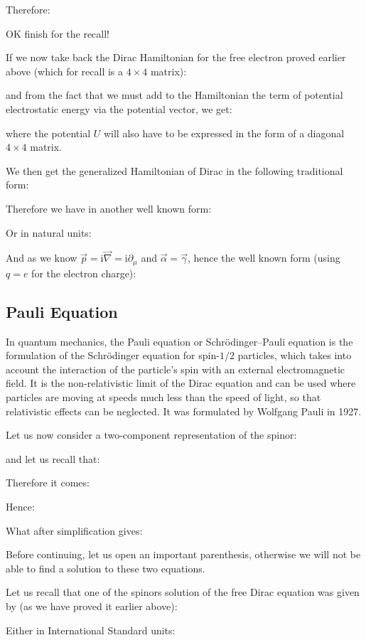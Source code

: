 	Therefore:
	
	OK finish for the recall!
	
	If we now take back the Dirac Hamiltonian for the free electron proved earlier above (which for recall is a $4\times 4$ matrix):
	
	and from the fact that we must add to the Hamiltonian the term of potential electrostatic energy via the potential vector, we get:
	
	where the potential $U$ will also have to be expressed in the form of a diagonal $4\times 4$ matrix.

	We then get the generalized Hamiltonian of Dirac in the following traditional form:
	
	Therefore we have in another well known form:
	
	Or in natural units:
	
	And as we know $\vec{p}=\mathrm{i}\vec{\nabla}=\mathrm{i}\partial_\mu$ and $\vec{\alpha}=\vec{\gamma}$, hence the well known form (using $q=e$ for the electron charge):
	
	
	\pagebreak
	\subsection{Pauli Equation}\label{pauli equation}
	In quantum mechanics, the Pauli equation or Schrödinger–Pauli equation is the formulation of the Schrödinger equation for spin-$1/2$ particles, which takes into account the interaction of the particle's spin with an external electromagnetic field. It is the non-relativistic limit of the Dirac equation and can be used where particles are moving at speeds much less than the speed of light, so that relativistic effects can be neglected. It was formulated by Wolfgang Pauli in 1927.
	
	Let us now consider a two-component representation of the spinor:
	
	and let us recall that:
	
	Therefore it comes:
	
	Hence:
	
	What after simplification gives:
	
	Before continuing, let us open an important parenthesis, otherwise we will not be able to find a solution to these two equations.

	Let us recall that one of the spinors solution of the free Dirac equation was given by (as we have proved it earlier above):
	
	Either in International Standard units:
	
